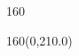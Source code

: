{\begin{textblock}{160}
\end{textblock}
\begin{textblock}{160}(0,210.0)
\textblockcolour{}
\vspace{-\parskip}
\begin{center} \@date \end{center}
\end{textblock}

}

